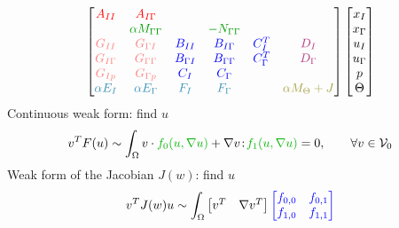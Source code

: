 \documentclass{beamer}
\begin{document}
\newcommand{\colorA}[1]{{\color{red} #1}}
\newcommand{\colorB}[1]{{\color{green!60!black} #1}}
\newcommand{\colorC}[1]{{\color{blue} #1}}
\newcommand{\colorD}[1]{{\color{magenta!70!black} #1}}
\newcommand{\colorE}[1]{{\color{cyan!70!black} #1}}
\newcommand{\colorF}[1]{{\color{yellow!60!black} #1}}
\newcommand{\colorG}[1]{{\color{red!50!white} #1}}
\begin{frame}
    \begin{equation*}
    \begin{bmatrix}
      \colorA{A_{II}} & \colorA{A_{I\Gamma}}             &                       &                             &                     &   \\
      & \colorB{\alpha M_{\Gamma\Gamma}} &                       & \colorB{- N_{\Gamma\Gamma}} &                       &  \\
      \colorG{G_{II}}      & \colorG{G_{\Gamma I}} & \colorC{B_{II}}       & \colorC{B_{I\Gamma}}        & \colorC{C_{I}^T}    & \colorD{D_I} \\
      \colorG{G_{I\Gamma}} &        \colorG{G_{\Gamma\Gamma}}                          & \colorC{B_{\Gamma I}} & \colorC{B_{\Gamma\Gamma}}   & \colorC{C_{\Gamma}^T} & \colorD{D_\Gamma} \\
      \colorG{G_{Ip}}        &  \colorG{G_{\Gamma p}}                                & \colorC{C_{I}}        & \colorC{C_{\Gamma}}         &                   & \\
      \colorE{\alpha E_I}    & \colorE{\alpha E_\Gamma} & \colorE{F_I} & \colorE{F_\Gamma} & & \colorF{\alpha M_\Theta + J}
    \end{bmatrix}
    \begin{bmatrix}
      x_I \\ x_\Gamma \\ u_I \\ u_\Gamma \\ p \\ \Theta
    \end{bmatrix}
  \end{equation*}
  Continuous weak form: find $u$
    \[ v^T F(u) \sim \int_\Omega v \cdot {\color{green!70!black} f_0(u,\nabla u)}
    + \nabla v \tcolon {\color{green!70!black} f_1(u,\nabla u)} = 0, \qquad \forall v \in \VV_0 \]
    Weak form of the Jacobian $J(w)$: find $u$
    \begin{gather*}
      v^T J(w) u \sim \int_\Omega \begin{bmatrix} v^T & \nabla v^T \end{bmatrix}
      {\color{blue} \begin{bmatrix} f_{0,0} & f_{0,1} \\ f_{1,0} & f_{1,1} \end{bmatrix}}

\end{gather*}
\end{frame}
\end{document}
